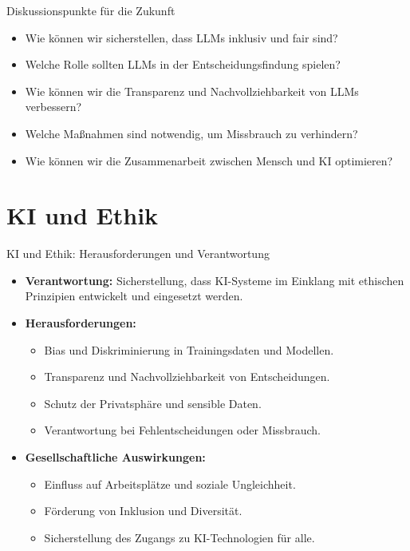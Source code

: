 \documentclass[aspectratio=1610, xcolor=dvipsnames, 9pt]{beamer}
\begin{document}
\begin{frame}{Diskussionspunkte für die Zukunft}
  \begin{itemize}
    \item Wie können wir sicherstellen, dass LLMs inklusiv und fair sind? \\
    \item Welche Rolle sollten LLMs in der Entscheidungsfindung spielen? \\
    \item Wie können wir die Transparenz und Nachvollziehbarkeit von LLMs verbessern? \\
    \item Welche Maßnahmen sind notwendig, um Missbrauch zu verhindern? \\
    \item Wie können wir die Zusammenarbeit zwischen Mensch und KI optimieren?
  \end{itemize}
\end{frame}

\section{KI und Ethik}

\begin{frame}{KI und Ethik: Herausforderungen und Verantwortung}
  \begin{itemize}
    \item \textbf{Verantwortung:}
     Sicherstellung, dass KI-Systeme im Einklang mit ethischen Prinzipien entwickelt und eingesetzt werden.
    \item \textbf{Herausforderungen:}
      \begin{itemize}
        \item Bias und Diskriminierung in Trainingsdaten und Modellen.
        \item Transparenz und Nachvollziehbarkeit von Entscheidungen.
        \item Schutz der Privatsphäre und sensible Daten.
        \item Verantwortung bei Fehlentscheidungen oder Missbrauch.
      \end{itemize}
    \item \textbf{Gesellschaftliche Auswirkungen:}
      \begin{itemize}
        \item Einfluss auf Arbeitsplätze und soziale Ungleichheit.
        \item Förderung von Inklusion und Diversität.
        \item Sicherstellung des Zugangs zu KI-Technologien für alle.
      \end{itemize}
  \end{itemize}
\end{frame}
\end{document}
